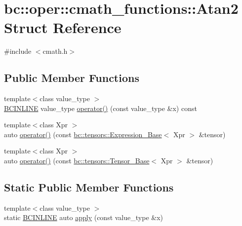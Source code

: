 \hypertarget{structbc_1_1oper_1_1cmath__functions_1_1Atan2}{}\section{bc\+:\+:oper\+:\+:cmath\+\_\+functions\+:\+:Atan2 Struct Reference}
\label{structbc_1_1oper_1_1cmath__functions_1_1Atan2}


{\ttfamily \#include $<$cmath.\+h$>$}

\subsection*{Public Member Functions}
\begin{DoxyCompactItemize}
\item 
{\footnotesize template$<$class value\+\_\+type $>$ }\\\hyperlink{common_8h_a6699e8b0449da5c0fafb878e59c1d4b1}{B\+C\+I\+N\+L\+I\+NE} value\+\_\+type \hyperlink{structbc_1_1oper_1_1cmath__functions_1_1Atan2_aa088c1a3f9aaa67f66bf0c49f1e61a1e}{operator()} (const value\+\_\+type \&x) const
\item 
{\footnotesize template$<$class Xpr $>$ }\\auto \hyperlink{structbc_1_1oper_1_1cmath__functions_1_1Atan2_afc4658ef4e3d6291e49a357a37071fa8}{operator()} (const \hyperlink{classbc_1_1tensors_1_1Expression__Base}{bc\+::tensors\+::\+Expression\+\_\+\+Base}$<$ Xpr $>$ \&tensor)
\item 
{\footnotesize template$<$class Xpr $>$ }\\auto \hyperlink{structbc_1_1oper_1_1cmath__functions_1_1Atan2_a03ed6789a0a864f1034ffd6c90e1237c}{operator()} (const \hyperlink{classbc_1_1tensors_1_1Tensor__Base}{bc\+::tensors\+::\+Tensor\+\_\+\+Base}$<$ Xpr $>$ \&tensor)
\end{DoxyCompactItemize}
\subsection*{Static Public Member Functions}
\begin{DoxyCompactItemize}
\item 
{\footnotesize template$<$class value\+\_\+type $>$ }\\static \hyperlink{common_8h_a6699e8b0449da5c0fafb878e59c1d4b1}{B\+C\+I\+N\+L\+I\+NE} auto \hyperlink{structbc_1_1oper_1_1cmath__functions_1_1Atan2_ac24c9f40bb5bf2ff82f22efaf458d43d}{apply} (const value\+\_\+type \&x)
\end{DoxyCompactItemize}


